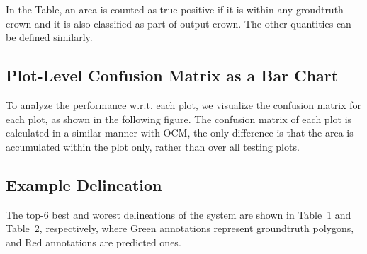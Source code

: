 \documentclass[]{report}   %
\begin{document}

\\\\
\noindent In the Table, an area is counted as true positive if it is within any groudtruth crown and it is also classified as part of output crown. The other quantities can be defined similarly.

\subsection*{Plot-Level Confusion Matrix as a Bar Chart}
To analyze the performance w.r.t. each plot, we visualize the confusion matrix for each plot, as shown in the following figure. The confusion matrix of each plot is calculated in a similar manner with OCM, the only difference is that the area is accumulated within the plot only, rather than over all testing plots.
\begin{figure}[H]
    \centering
    \def\svgwidth{0.9\columnwidth}
    
\end{figure}


\subsection*{Example Delineation}
The top-6 best and worest delineations of the system are shown in Table~1 and Table~2, respectively, where Green annotations represent groundtruth polygons, and Red annotations are predicted ones.
\end{document}
